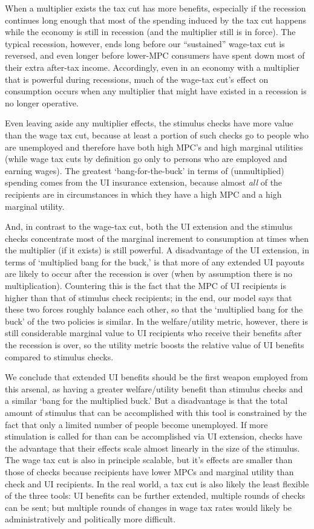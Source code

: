 \documentclass[../HAFiscal]{subfiles}
\begin{document}
When a multiplier exists the tax cut has more benefits, especially if the recession continues long enough that most of the spending induced by the tax cut happens while the economy is still in recession (and the multiplier still is in force).  The typical recession, however, ends long before our ``sustained'' wage-tax cut is reversed, and even longer before lower-MPC consumers have spent down most of their extra after-tax income. Accordingly, even in an economy with a multiplier that is powerful during recessions, much of the wage-tax cut's effect on consumption occurs when any multiplier that might have existed in a recession is no longer operative.

Even leaving aside any multiplier effects, the stimulus checks have more value than the wage tax cut, because at least a portion of such checks go to people who are unemployed and therefore have both high MPC's and high marginal utilities (while wage tax cuts by definition go only to persons who are employed and earning wages).  The greatest `bang-for-the-buck' in terms of (unmultiplied) spending comes from the UI insurance extension, because almost \textit{all} of the recipients are in circumstances in which they have a high MPC and a high marginal utility.

And, in contrast to the wage-tax cut, both the UI extension and the stimulus checks concentrate most of the marginal increment to consumption at times when the multiplier (if it exists) is still powerful.  A disadvantage of the UI extension, in terms of `multiplied bang for the buck,' is that more of any extended UI payouts are likely to occur after the recession is over (when by assumption there is no multiplication).  Countering this is the fact that the MPC of UI recipients is higher than that of stimulus check recipients; in the end, our model says that these two forces roughly balance each other, so that the `multiplied bang for the buck' of the two policies is similar.  In the welfare/utility metric, however, there is still considerable marginal value to UI recipients who receive their benefits after the recession is over, so the utility metric boosts the relative value of UI benefits compared to stimulus checks.

We conclude that extended UI benefits should be the first weapon employed from this arsenal, as having a greater welfare/utility benefit than stimulus checks and a similar `bang for the multiplied buck.' But a disadvantage is that the total amount of stimulus that can be accomplished with this tool is constrained by the fact that only a limited number of people become unemployed.  If more stimulation is called for than can be accomplished via UI extension, checks have the advantage that their effects scale almost linearly in the size of the stimulus.  The wage tax cut is also in principle scalable, but it's effects are smaller than those of checks because recipients have lower MPCs and marginal utility than check and UI recipients.  In the real world, a tax cut is also likely the least flexible of the three tools:  UI benefits can be further extended, multiple rounds of checks can be sent; but multiple rounds of changes in wage tax rates would likely be administratively and politically more difficult.
\end{document}
